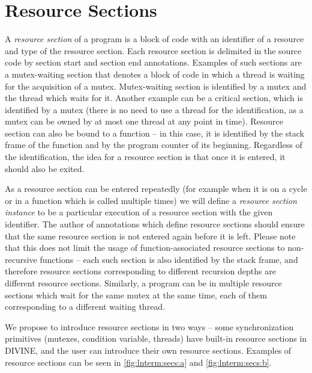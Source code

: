
\section{Resource Sections}

A \emph{resource section} of a program is a block of code with an identifier of a resource and type of the resource section.
Each resource section is delimited in the source code by section start and section end annotations.
Examples of such sections are a mutex-waiting section that denotes a block of code in which a thread is waiting for the acquisition of a mutex.
Mutex-waiting section is identified by a mutex and the thread which waits for it.
Another example can be a critical section, which is identified by a mutex (there is no need to use a thread for the identification, as a mutex can be owned by at most one thread at any point in time).
Resource section can also be bound to a function -- in this case, it is identified by the stack frame of the function and by the program counter of its beginning.
Regardless of the identification, the idea for a resource section is that once it is entered, it should also be exited.

As a resource section can be entered repeatedly (for example when it is on a cycle or in a function which is called multiple times) we will define a \emph{resource section instance} to be a particular execution of a resource section with the given identifier.
The author of annotations which define resource sections should ensure that the same resource section is not entered again before it is left.
Please note that this does not limit the usage of function-associated resource sections to non-recursive functions -- each such section is also identified by the stack frame, and therefore resource sections corresponding to different recursion depths are different resource sections.
Similarly, a program can be in multiple resource sections which wait for the same mutex at the same time, each of them corresponding to a different waiting thread.

We propose to introduce resource sections in two ways -- some synchronization primitives (mutexes, condition variable, threads) have built-in resource sections in DIVINE, and the user can introduce their own resource sections.
Examples of resource sections can be seen in \autoref{fig:lnterm:secs:a} and \autoref{fig:lnterm:secs:b}.

